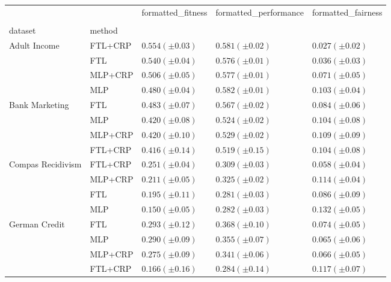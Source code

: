 \begin{tabular}{lllll}
\toprule
 &  & formatted_fitness & formatted_performance & formatted_fairness \\
 &  &  &  &  \\
dataset & method &  &  &  \\
\midrule
\multirow[t]{4}{*}{Adult Income} & FTL+CRP & $0.554 (\pm0.03)$ & $0.581 (\pm0.02)$ & $0.027 (\pm0.02)$ \\
 & FTL & $0.540 (\pm0.04)$ & $0.576 (\pm0.01)$ & $0.036 (\pm0.03)$ \\
 & MLP+CRP & $0.506 (\pm0.05)$ & $0.577 (\pm0.01)$ & $0.071 (\pm0.05)$ \\
 & MLP & $0.480 (\pm0.04)$ & $0.582 (\pm0.01)$ & $0.103 (\pm0.04)$ \\
\cline{1-5}
\multirow[t]{4}{*}{Bank Marketing} & FTL & $0.483 (\pm0.07)$ & $0.567 (\pm0.02)$ & $0.084 (\pm0.06)$ \\
 & MLP & $0.420 (\pm0.08)$ & $0.524 (\pm0.02)$ & $0.104 (\pm0.08)$ \\
 & MLP+CRP & $0.420 (\pm0.10)$ & $0.529 (\pm0.02)$ & $0.109 (\pm0.09)$ \\
 & FTL+CRP & $0.416 (\pm0.14)$ & $0.519 (\pm0.15)$ & $0.104 (\pm0.08)$ \\
\cline{1-5}
\multirow[t]{4}{*}{Compas Recidivism} & FTL+CRP & $0.251 (\pm0.04)$ & $0.309 (\pm0.03)$ & $0.058 (\pm0.04)$ \\
 & MLP+CRP & $0.211 (\pm0.05)$ & $0.325 (\pm0.02)$ & $0.114 (\pm0.04)$ \\
 & FTL & $0.195 (\pm0.11)$ & $0.281 (\pm0.03)$ & $0.086 (\pm0.09)$ \\
 & MLP & $0.150 (\pm0.05)$ & $0.282 (\pm0.03)$ & $0.132 (\pm0.05)$ \\
\cline{1-5}
\multirow[t]{4}{*}{German Credit} & FTL & $0.293 (\pm0.12)$ & $0.368 (\pm0.10)$ & $0.074 (\pm0.05)$ \\
 & MLP & $0.290 (\pm0.09)$ & $0.355 (\pm0.07)$ & $0.065 (\pm0.06)$ \\
 & MLP+CRP & $0.275 (\pm0.09)$ & $0.341 (\pm0.06)$ & $0.066 (\pm0.05)$ \\
 & FTL+CRP & $0.166 (\pm0.16)$ & $0.284 (\pm0.14)$ & $0.117 (\pm0.07)$ \\
\cline{1-5}
\bottomrule
\end{tabular}
